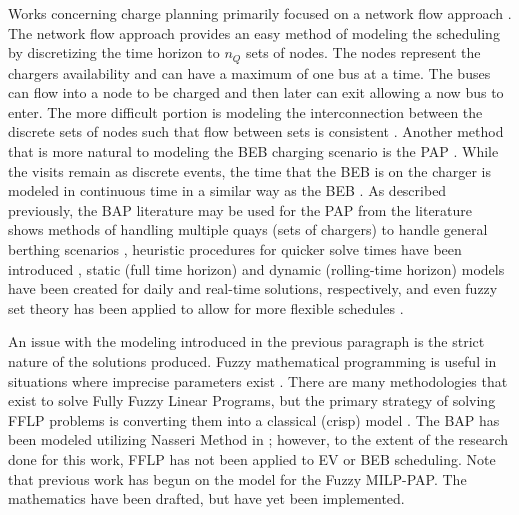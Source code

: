 \documentclass[ee,msthesis]{usuthesis}
\begin{document}
Works concerning charge planning primarily focused on a network flow approach
\cite{whitaker-2022-a-network,liu-2020-batter-elect}. The network flow approach provides an easy method of modeling
the scheduling by discretizing the time horizon to \(n_Q\) sets of nodes. The nodes represent the chargers availability
and can have a maximum of one bus at a time. The buses can flow into a node to be charged and then later can exit
allowing a now bus to enter. The more difficult portion is modeling the interconnection between the discrete sets of
nodes such that flow between sets is consistent \cite{whitaker-2022-a-network}. Another method that is more natural to
modeling the BEB charging scenario is the PAP \cite{qarebagh-2019-optim-sched}. While the visits remain as discrete
events, the time that the BEB is on the charger is modeled in continuous time in a similar way as the BEB
\cite{frojan-2015-contin-berth,qarebagh-2019-optim-sched}. As described previously, the BAP literature may be used
for the PAP from the literature shows methods of handling multiple quays (sets of chargers) to handle general berthing
scenarios \cite{frojan-2015-contin-berth,dai-2008-suppl-chain-analy}, heuristic procedures for quicker solve times
have been introduced \cite{imai-2001-dynam-berth}, static (full time horizon) and dynamic (rolling-time horizon) models
have been created for daily and real-time solutions, respectively, and even fuzzy set theory has been applied to allow
for more flexible schedules \cite{bello-2019-fuzzy-activ}.

An issue with the modeling introduced in the previous paragraph is the strict nature of the solutions produced. Fuzzy
mathematical programming is useful in situations where imprecise parameters exist \cite{bello-2019-fuzzy-activ}. There
are many methodologies that exist to solve Fully Fuzzy Linear Programs, but the primary strategy of solving FFLP
problems is converting them into a classical (crisp) model
\cite{bello-2019-fuzzy-activ,nasseri-2013-fully,kaur-2016-introd-fuzzy}. The BAP has been modeled utilizing Nasseri
Method in \cite{bello-2019-fuzzy-activ}; however, to the extent of the research done for this work, FFLP has not been
applied to EV or BEB scheduling. Note that previous work has begun on the model for the Fuzzy MILP-PAP. The mathematics
have been drafted, but have yet been implemented.
\end{document}
